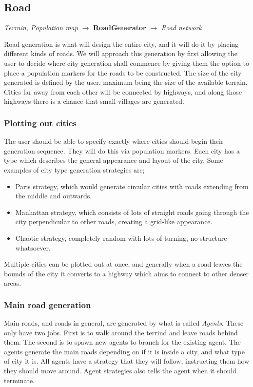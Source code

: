 \subsection{Road}
\begin{center}
  \textit{Terrain, Population map} $\rightarrow$ \textbf{RoadGenerator} $\rightarrow$ \textit{Road network} 
\end{center}
Road generation is what will design the entire city, and it will do it by placing different kinds of roads.
We will approach this generation by first allowing the user to decide where city generation shall commence by giving them the option to place a population markers for the roads to be constructed.
The size of the city generated is defined by the user, maximum being the size of the available terrain.
Cities far away from each other will be connected by highways, and along those highways there is a chance that small villages are generated.

\subsubsection{Plotting out cities}
The user should be able to specify exactly where cities should begin their generation sequence.
They will do this via population markers.
Each city has a type which describes the general appearance and layout of the city.
Some examples of city type generation strategies are;
\begin{itemize}
  \item Paris strategy, which would generate circular cities with roads extending from the middle and outwards.
  \item Manhattan strategy, which consists of lots of straight roads going through the city perpendicular to other roads, creating a grid-like appearance.
  \item Chaotic strategy, completely random with lots of turning, no structure whatsoever.
\end{itemize}

Multiple cities can be plotted out at once, and generally when a road leaves the bounds of the city it converts to a highway which aims to connect to other denser areas.

\subsubsection{Main road generation}
Main roads, and roads in general, are generated by what is called \textit{Agents}.
These only have two jobs.
First is to walk around the terrind and leave roads behind them.
The second is to spawn new agents to branch for the existing agent.
The agents generate the main roads depending on if it is inside a city, and what type of city it is.
All agents have a strategy that they will follow, instructing them how they should move around.
Agent strategies also tells the agent when it should terminate.

